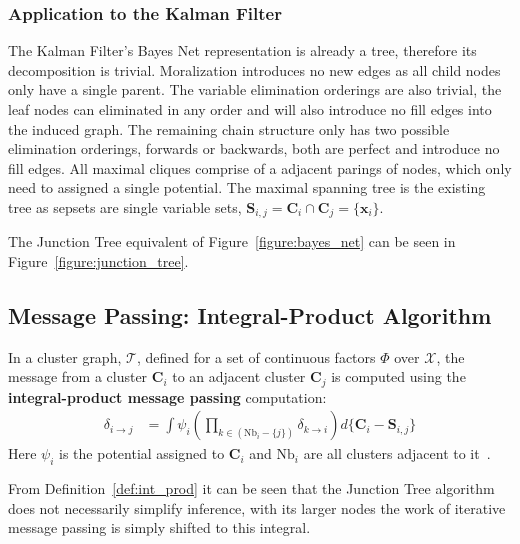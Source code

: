 \subsubsection{Application to the Kalman Filter}
\label{section:kalman_filter}
The Kalman Filter's Bayes Net representation is already a tree, therefore its decomposition is trivial. Moralization introduces no new edges as all child nodes only have a single parent. The variable elimination orderings are also trivial, the leaf nodes can eliminated in any order and will also introduce no fill edges into the induced graph. The remaining chain structure only has two possible elimination orderings, forwards or backwards, both are perfect and introduce no fill edges. All maximal cliques comprise of a adjacent parings of nodes, which only need to assigned a single potential. The maximal spanning tree is the existing tree as sepsets are single variable sets, $\pmb{S}_{i, j} = \pmb{C}_{i} \cap \pmb{C}_{j} = \{ \pmb{x}_{i} \} $.

The Junction Tree equivalent of Figure~\ref{figure:bayes_net} can be seen in Figure~\ref{figure:junction_tree}.



\subsection{Message Passing: Integral-Product Algorithm}
\label{subsection:message_passing}
 
\begin{definition}  \label{def:int_prod}
In a cluster graph, $\mathcal{T}$, defined for a set of continuous factors $\Phi$ over $\mathcal{X}$, the message from a cluster $\pmb{C}_{i}$ to an adjacent cluster $\pmb{C}_{j}$ is computed using the \textbf{integral-product message passing} computation:
\begin{align}
\delta_{i \rightarrow j} &= \int \psi_{i} \left( \prod_{k \in \left( \mbox{Nb}_{i} - \{ j \} \right)} \delta_{k \rightarrow i} \right) d\{ {\pmb{C}_{i} - \pmb{S}_{i, j}} \} \label{eqn:int_prod}
\end{align}
Here $\psi_{i}$ is the potential assigned to $\pmb{C}_{i}$ and $\mbox{Nb}_{i}$ are all clusters adjacent to it~\cite{Barber_junction_tree, Koller_clique_trees, Koller_canonical}.
\end{definition}
From Definition~\ref{def:int_prod} it can be seen that the Junction Tree algorithm does not necessarily simplify inference, with its larger nodes the work of iterative message passing is simply shifted to this integral.


